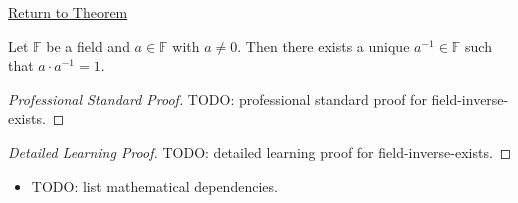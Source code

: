 \newpage
{}
\label{prf:field-inverse-exists}

\begin{remark*}[Return]
\hyperref[prop:field-inverse-exists]{Return to Theorem}
\end{remark*}

\begin{proposition*}
Let $\mathbb{F}$ be a field and $a \in \mathbb{F}$ with $a \neq 0$.
Then there exists a unique $a^{-1} \in \mathbb{F}$ such that
$a \cdot a^{-1} = 1$.
\end{proposition*}

\begin{proof}[Professional Standard Proof]
\LRAProofBodyStart
TODO: professional standard proof for field-inverse-exists.
\end{proof}

\begin{proof}[Detailed Learning Proof]
\LRAProofBodyStart
TODO: detailed learning proof for field-inverse-exists.
\end{proof}

\begin{remark*}
\end{remark*}

\begin{dependencies}
\begin{itemize}
  \item TODO: list mathematical dependencies.
\end{itemize}
\end{dependencies}

\clearpage
